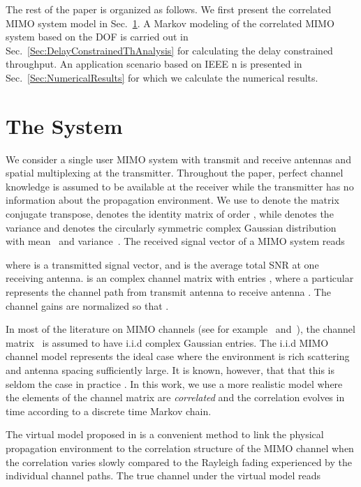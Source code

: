 \documentclass[10pt,conference]{IEEEtran}
\begin{document}
The rest of the paper is organized as follows.
We first present the correlated MIMO system model in Sec.~\ref{sec:prelim}. A Markov modeling of the correlated MIMO system based on the DOF is carried out in Sec.~\ref{Sec:DelayConstrainedThAnalysis} for calculating the delay constrained throughput.
An application scenario based on IEEE n is presented in Sec.~\ref{Sec:NumericalResults} for which we calculate the numerical results.

\section{The System}
\label{sec:prelim}


We consider a single user MIMO system with  transmit and  receive antennas and spatial multiplexing at the transmitter.
Throughout the paper, perfect channel knowledge is assumed to be available at the receiver while the transmitter has no information about the propagation environment.
We use  to denote the matrix conjugate transpose,  denotes the identity matrix of order , while  denotes the variance and  denotes the circularly symmetric complex Gaussian distribution with mean~ and variance~.
The  received signal vector  of a MIMO system reads

where  is a  transmitted signal vector,  and  is the average total SNR at one receiving antenna.
 is an  complex channel matrix with entries , where a particular  represents the channel path from transmit antenna  to receive antenna .
The channel gains are normalized so that .



In most of the literature on MIMO channels (see for example \cite{MIMO:Foschini:98:limits}~and~\cite{MIMO:Teletar99:CapacityOfMultiAntennaGaus}), the channel matrix~ is assumed to have i.i.d complex Gaussian entries.
The i.i.d  MIMO channel model represents the ideal case where the environment is rich scattering and antenna spacing sufficiently large.
It is known, however, that that this is seldom the case in practice \cite{MIMO:Correlated:Sayeed02:Deconstructing,MIMO:Veeravalli2005:CorrelatedMIMO:Variance}.
In this work, we use a more realistic model where the elements of the channel matrix are \emph{correlated} and the correlation evolves in time according to a discrete time Markov chain.

The virtual model proposed in \cite{MIMO:Correlated:Sayeed02:Deconstructing, MIMO:Veeravalli2005:CorrelatedMIMO:Variance} is a convenient method to link the physical propagation environment to the correlation structure of the MIMO channel when the correlation varies slowly compared to the Rayleigh fading experienced by the individual channel paths.  The true channel under the virtual model reads
\end{document}
